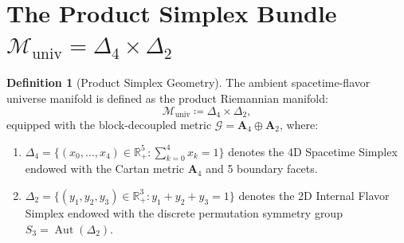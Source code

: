 \documentclass[11pt,reqno]{amsart}
\theoremstyle{definition}
\newtheorem{definition}[theorem]{Definition}
\begin{document}
\section{\texorpdfstring{The Product Simplex Bundle $\mathcal{M}_{\mathrm{univ}} = \Delta_4 \times \Delta_2$}{The Product Simplex Bundle M\_univ = Delta\_4 x Delta\_2}}

\begin{definition}[Product Simplex Geometry]
The ambient spacetime-flavor universe manifold is defined as the product Riemannian manifold:
\begin{equation}
    \mathcal{M}_{\mathrm{univ}} \coloneqq \Delta_4 \times \Delta_2,
\end{equation}
equipped with the block-decoupled metric $\mathcal{G} = \mathbf{A}_4 \oplus \mathbf{A}_2$, where:
\begin{enumerate}
    \item $\Delta_4 = \{(x_0, \dots, x_4) \in \mathbb{R}_+^5 : \sum_{k=0}^4 x_k = 1\}$ denotes the 4D Spacetime Simplex endowed with the Cartan metric $\mathbf{A}_4$ and 5 boundary facets.
    \item $\Delta_2 = \{(y_1, y_2, y_3) \in \mathbb{R}_+^3 : y_1 + y_2 + y_3 = 1\}$ denotes the 2D Internal Flavor Simplex endowed with the discrete permutation symmetry group $S_3 = \operatorname{Aut}(\Delta_2)$.
\end{enumerate}
\end{definition}
\end{document}
